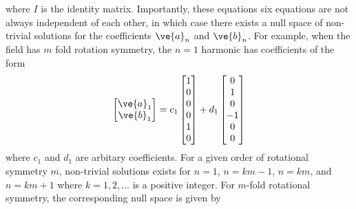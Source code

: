 where $I$ is the identity matrix.  Importantly, these equations six equations are not always independent of each other, in which case there exists a null space of non-trivial solutions for the coefficients $\ve{a}_n$ and $\ve{b}_n$.  For example, when the field has $m$ fold rotation symmetry, the $n=1$ harmonic has coefficients of the form 
\begin{equation}
    \begin{bmatrix} \ve{a}_1 \\ \ve{b}_1 \end{bmatrix} = c_1 \begin{bmatrix} 1\\0\\0\\0\\1\\0 \end{bmatrix} + d_1 \begin{bmatrix} 0\\1\\0\\-1\\0\\0 \end{bmatrix}
\end{equation}
where $c_1$ and $d_1$ are arbitary coefficients. For a given order of rotational symmetry $m$, non-trivial solutions exists for $n=1$, $n=k m-1$, $n=k m$, and $n=k m + 1$  where $k= 1,2,\dots$ is a positive integer. For $m$-fold rotational symmetry, the corresponding null space is given by
